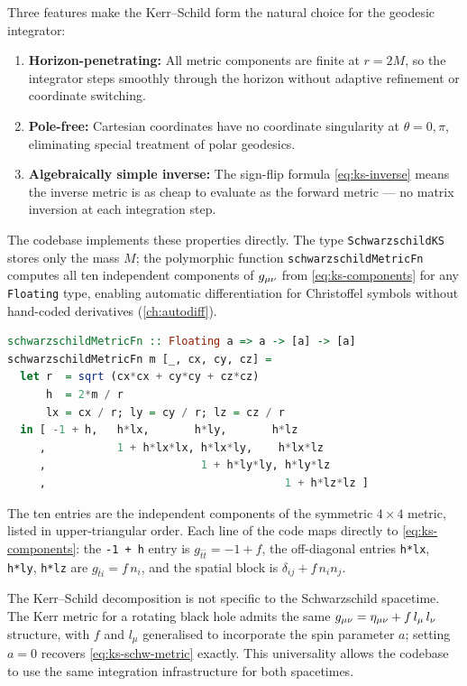 Three features make the Kerr--Schild form the natural choice for the
geodesic integrator:
%
\begin{enumerate}
\item \textbf{Horizon-penetrating:} All metric components are finite
  at $r = 2M$, so the integrator steps smoothly through the horizon
  without adaptive refinement or coordinate switching.
\item \textbf{Pole-free:} Cartesian coordinates have no
  coordinate singularity at $\theta = 0, \pi$, eliminating special
  treatment of polar geodesics.
\item \textbf{Algebraically simple inverse:} The sign-flip formula
  \eqref{eq:ks-inverse} means the inverse metric is as cheap to
  evaluate as the forward metric --- no matrix inversion at each
  integration step.
\end{enumerate}
%
The codebase implements these properties directly.  The type
\texttt{SchwarzschildKS} stores only the mass $M$; the polymorphic function
\texttt{schwarzschildMetricFn} computes all ten independent components
of $g_{\mu\nu}$ from \cref{eq:ks-components} for any \texttt{Floating}
type, enabling automatic differentiation for Christoffel symbols without
hand-coded derivatives (\cref{ch:autodiff}).
%
\begin{lstlisting}[language=Haskell]
schwarzschildMetricFn :: Floating a => a -> [a] -> [a]
schwarzschildMetricFn m [_, cx, cy, cz] =
  let r  = sqrt (cx*cx + cy*cy + cz*cz)
      h  = 2*m / r
      lx = cx / r; ly = cy / r; lz = cz / r
  in [ -1 + h,   h*lx,       h*ly,       h*lz
     ,           1 + h*lx*lx, h*lx*ly,    h*lx*lz
     ,                        1 + h*ly*ly, h*ly*lz
     ,                                     1 + h*lz*lz ]
\end{lstlisting}
%
The ten entries are the independent components of the symmetric
$4 \times 4$ metric, listed in upper-triangular order.  Each line
of the code maps directly to \cref{eq:ks-components}: the \texttt{-1 + h}
entry is $g_{\bar{t}\bar{t}} = -1 + f$, the off-diagonal entries
\texttt{h*lx}, \texttt{h*ly}, \texttt{h*lz} are $g_{\bar{t}i} = f\,n_i$,
and the spatial block is $\delta_{ij} + f\,n_i n_j$.

The Kerr--Schild decomposition is not specific to the Schwarzschild
spacetime.  The Kerr metric for a rotating black hole admits the same
$g_{\mu\nu} = \eta_{\mu\nu} + f\,l_\mu\,l_\nu$ structure, with $f$ and
$l_\mu$ generalised to incorporate the spin parameter $a$; setting $a = 0$
recovers \cref{eq:ks-schw-metric} exactly.  This universality allows the
codebase to use the same integration infrastructure for both spacetimes.
